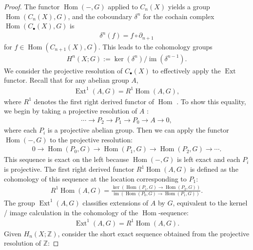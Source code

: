\begin{proof}
The functor $\operatorname{Hom}(-, G)$ applied to $C_{n}(X)$ yields a group $\operatorname{Hom}(C_{n}(X), G)$, and the coboundary $\delta^{n}$ for the cochain complex $\operatorname{Hom}(C_{\bullet}(X), G)$ is 
\begin{align}
\delta^{n}(f) = f \circ \partial_{n+1}
\end{align}
for $f \in \operatorname{Hom}(C_{n+1}(X), G)$. This leads to the cohomology groups
\begin{align}
H^{n}(X; G) := \ker(\delta^{n}) / \operatorname{im}(\delta^{n-1}).
\end{align}
We consider the projective resolution of $C_{\bullet}(X)$ to effectively apply the $\operatorname{Ext}$ functor. Recall that for any abelian group $A$,
\begin{align}
\operatorname{Ext}^{1}(A, G) = R^{1} \operatorname{Hom}(A, G),
\end{align}
where $R^{1}$ denotes the first right derived functor of $\operatorname{Hom}$ \cite[\S 2.7]{Weibel1994}. To show this equality, we begin by taking a projective resolution of $A$ \cite[p.39f]{Weibel1994}:
\begin{align}
\cdots \to P_{2} \to P_{1} \to P_{0} \to A \to 0,
\end{align}
where each $P_{i}$ is a projective abelian group. Then we can apply the functor $\operatorname{Hom}(-, G)$ to the projective resolution:
\begin{align}
0 \to \operatorname{Hom}(P_{0}, G) \to \operatorname{Hom}(P_{1}, G) \to \operatorname{Hom}(P_{2}, G) \to \cdots.
\end{align}
This sequence is exact on the left because $\operatorname{Hom}(-, G)$ is left exact and each $P_{i}$ is projective. The first right derived functor $R^{1}\operatorname{Hom}(A, G)$ is defined as the cohomology of this sequence at the location corresponding to $P_{1}$:
\begin{align}
R^{1} \operatorname{Hom}(A, G) = \frac{\ker(\operatorname{Hom}(P_{1}, G) \to \operatorname{Hom}(P_{2}, G))}{\operatorname{im}(\operatorname{Hom}(P_{0}, G) \to \operatorname{Hom}(P_{1}, G))}.
\end{align}
The group $\operatorname{Ext}^{1}(A, G)$ classifies extensions of $A$ by $G$, equivalent to the kernel / image calculation in the cohomology of the $\operatorname{Hom}$-sequence:
\begin{align}
\operatorname{Ext}^{1}(A, G) = R^{1} \operatorname{Hom}(A, G).
\end{align}
Given $H_{n}(X; \mathbb{Z})$, consider the short exact sequence obtained from the projective resolution of $\mathbb{Z}$:

\end{proof}
